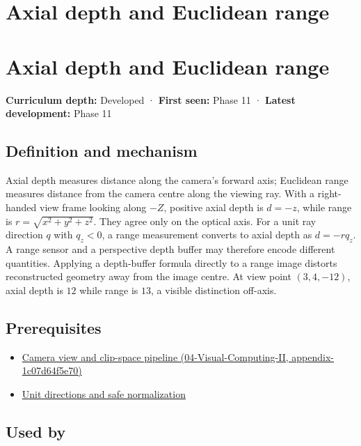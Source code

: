 \hypertarget{appendix-cac01ebeeb11}{}
\section*{Axial depth and Euclidean range}
\section{Axial depth and Euclidean range}\label{axial-depth-and-euclidean-range}

\textbf{Curriculum depth:} Developed · \textbf{First seen:} Phase 11 · \textbf{Latest development:} Phase 11

\subsection{Definition and mechanism}\label{definition-and-mechanism}

Axial depth measures distance along the camera's forward axis; Euclidean range measures distance from the camera centre along the viewing ray. With a right-handed view frame looking along \(-Z\), positive axial depth is \(d=-z\), while range is \(r=\sqrt{x^2+y^2+z^2}\). They agree only on the optical axis. For a unit ray direction \(q\) with \(q_z<0\), a range measurement converts to axial depth as \(d=-rq_z\). A range sensor and a perspective depth buffer may therefore encode different quantities. Applying a depth-buffer formula directly to a range image distorts reconstructed geometry away from the image centre. At view point \((3,4,-12)\), axial depth is \(12\) while range is \(13\), a visible distinction off-axis.

\subsection{Prerequisites}\label{prerequisites}

\begin{itemize}
\tightlist
\item
  \href{}{Camera view and clip-space pipeline (04-Visual-Computing-II, appendix-1c07d64f5e70)}
\item
  \hyperref[appendix-f744e41b95b4]{Unit directions and safe normalization}
\end{itemize}

\subsection{Used by}\label{used-by}

